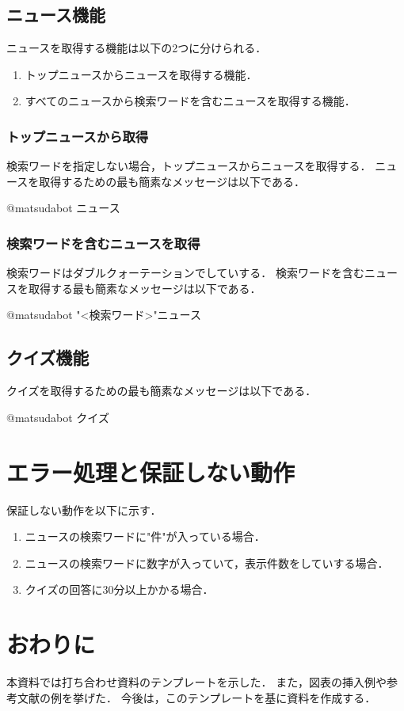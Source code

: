 \documentclass[12pt]{jsarticle}
\begin{document}
\subsection{ニュース機能}
ニュースを取得する機能は以下の2つに分けられる．
\begin{enumerate}
\item トップニュースからニュースを取得する機能．
\item すべてのニュースから検索ワードを含むニュースを取得する機能．
\end{enumerate}
\subsubsection{トップニュースから取得}
検索ワードを指定しない場合，トップニュースからニュースを取得する．
ニュースを取得するための最も簡素なメッセージは以下である．
\begin{center}
@matsudabot ニュース
\end{center}
\subsubsection{検索ワードを含むニュースを取得}
検索ワードはダブルクォーテーションでしていする．
検索ワードを含むニュースを取得する最も簡素なメッセージは以下である．
\begin{center}
@matsudabot "<検索ワード>"ニュース
\end{center}
\subsection{クイズ機能}
クイズを取得するための最も簡素なメッセージは以下である．
\begin{center}
@matsudabot クイズ
\end{center}

\section{エラー処理と保証しない動作}
保証しない動作を以下に示す．
\begin{enumerate}
\item ニュースの検索ワードに"件"が入っている場合．\\
\item ニュースの検索ワードに数字が入っていて，表示件数をしていする場合．\\
\item クイズの回答に30分以上かかる場合．\\
\end{enumerate}
\section{おわりに}
\label{sec:conclusion}
本資料では打ち合わせ資料のテンプレートを示した．
また，図表の挿入例や参考文献の例を挙げた．
今後は，このテンプレートを基に資料を作成する．



\end{document}

